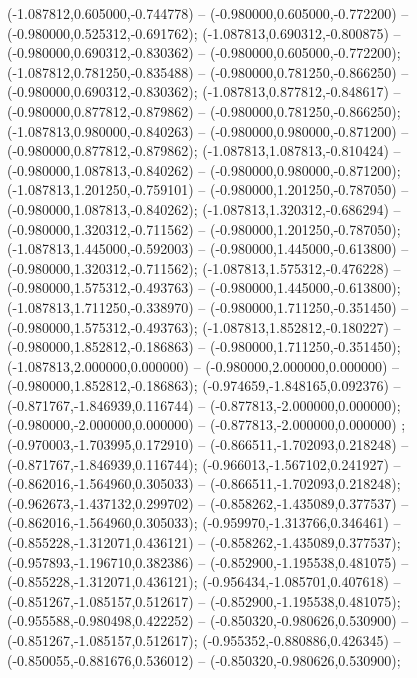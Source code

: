  (-1.087812,0.605000,-0.744778) -- (-0.980000,0.605000,-0.772200) -- (-0.980000,0.525312,-0.691762);
 (-1.087813,0.690312,-0.800875) -- (-0.980000,0.690312,-0.830362) -- (-0.980000,0.605000,-0.772200);
 (-1.087812,0.781250,-0.835488) -- (-0.980000,0.781250,-0.866250) -- (-0.980000,0.690312,-0.830362);
 (-1.087813,0.877812,-0.848617) -- (-0.980000,0.877812,-0.879862) -- (-0.980000,0.781250,-0.866250);
 (-1.087813,0.980000,-0.840263) -- (-0.980000,0.980000,-0.871200) -- (-0.980000,0.877812,-0.879862);
 (-1.087813,1.087813,-0.810424) -- (-0.980000,1.087813,-0.840262) -- (-0.980000,0.980000,-0.871200);
 (-1.087813,1.201250,-0.759101) -- (-0.980000,1.201250,-0.787050) -- (-0.980000,1.087813,-0.840262);
 (-1.087813,1.320312,-0.686294) -- (-0.980000,1.320312,-0.711562) -- (-0.980000,1.201250,-0.787050);
 (-1.087813,1.445000,-0.592003) -- (-0.980000,1.445000,-0.613800) -- (-0.980000,1.320312,-0.711562);
 (-1.087813,1.575312,-0.476228) -- (-0.980000,1.575312,-0.493763) -- (-0.980000,1.445000,-0.613800);
 (-1.087813,1.711250,-0.338970) -- (-0.980000,1.711250,-0.351450) -- (-0.980000,1.575312,-0.493763);
 (-1.087813,1.852812,-0.180227) -- (-0.980000,1.852812,-0.186863) -- (-0.980000,1.711250,-0.351450);
 (-1.087813,2.000000,0.000000) -- (-0.980000,2.000000,0.000000) -- (-0.980000,1.852812,-0.186863);
 (-0.974659,-1.848165,0.092376) -- (-0.871767,-1.846939,0.116744) -- (-0.877813,-2.000000,0.000000);
 (-0.980000,-2.000000,0.000000) -- (-0.877813,-2.000000,0.000000) ;
 (-0.970003,-1.703995,0.172910) -- (-0.866511,-1.702093,0.218248) -- (-0.871767,-1.846939,0.116744);
 (-0.966013,-1.567102,0.241927) -- (-0.862016,-1.564960,0.305033) -- (-0.866511,-1.702093,0.218248);
 (-0.962673,-1.437132,0.299702) -- (-0.858262,-1.435089,0.377537) -- (-0.862016,-1.564960,0.305033);
 (-0.959970,-1.313766,0.346461) -- (-0.855228,-1.312071,0.436121) -- (-0.858262,-1.435089,0.377537);
 (-0.957893,-1.196710,0.382386) -- (-0.852900,-1.195538,0.481075) -- (-0.855228,-1.312071,0.436121);
 (-0.956434,-1.085701,0.407618) -- (-0.851267,-1.085157,0.512617) -- (-0.852900,-1.195538,0.481075);
 (-0.955588,-0.980498,0.422252) -- (-0.850320,-0.980626,0.530900) -- (-0.851267,-1.085157,0.512617);
 (-0.955352,-0.880886,0.426345) -- (-0.850055,-0.881676,0.536012) -- (-0.850320,-0.980626,0.530900);
